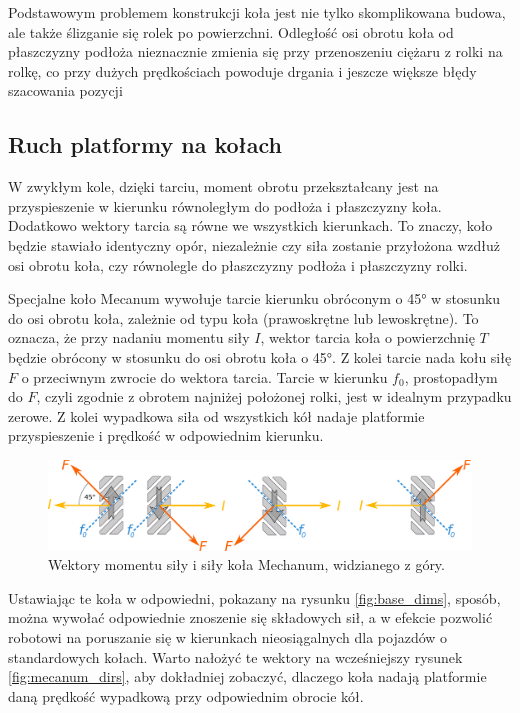 	Podstawowym problemem konstrukcji koła jest nie tylko skomplikowana budowa, ale także ślizganie się rolek po powierzchni.
	Odległość osi obrotu koła od płaszczyzny podłoża nieznacznie zmienia się przy przenoszeniu ciężaru z rolki na rolkę, co przy dużych prędkościach powoduje drgania i jeszcze większe błędy szacowania pozycji

	\subsection{Ruch platformy na kołach}
		W zwykłym kole, dzięki tarciu, moment obrotu przekształcany jest na przyspieszenie w kierunku równoległym do podłoża i płaszczyzny koła.
		Dodatkowo wektory tarcia są równe we wszystkich kierunkach. To znaczy, koło będzie stawiało identyczny opór, niezależnie czy siła
		zostanie przyłożona wzdłuż osi obrotu koła, czy równolegle do płaszczyzny podłoża i płaszczyzny rolki.
		
		Specjalne koło Mecanum wywołuje tarcie kierunku obróconym o 45° w stosunku do osi obrotu koła, zależnie od typu koła (prawoskrętne lub lewoskrętne). 
		To oznacza, że przy nadaniu momentu siły $I$, wektor tarcia koła o powierzchnię $T$ będzie obrócony w stosunku do osi obrotu koła o 45°.
		Z kolei tarcie nada kołu siłę $F$ o przeciwnym zwrocie do wektora tarcia.
		Tarcie w kierunku $f_0$, prostopadłym do $F$, czyli zgodnie z obrotem najniżej położonej rolki, jest w idealnym przypadku zerowe.
		Z kolei wypadkowa siła od wszystkich kół nadaje platformie przyspieszenie i prędkość w odpowiednim kierunku.

		\begin{figure}[H]
		\centering
		\includegraphics[width=\textwidth]{graphics/vectors.pdf}
		\caption{Wektory momentu siły i siły koła Mechanum, widzianego z góry.}
		\label{fig:wheel_vectors}
		\end{figure} 

		Ustawiając te koła w odpowiedni, pokazany na rysunku \ref{fig:base_dims}, sposób, można wywołać odpowiednie znoszenie się składowych sił,
		a w efekcie pozwolić robotowi na poruszanie się w kierunkach nieosiągalnych dla pojazdów o standardowych kołach.
		Warto nałożyć te wektory na wcześniejszy rysunek \ref{fig:mecanum_dirs}, aby dokładniej zobaczyć, 
		dlaczego koła nadają platformie daną prędkość wypadkową przy odpowiednim obrocie kół.

